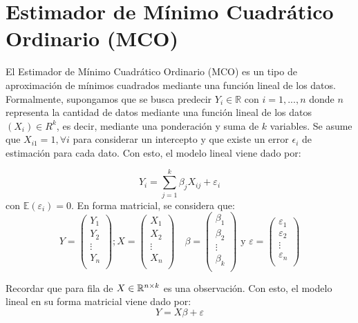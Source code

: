 \section{Estimador de Mínimo Cuadrático Ordinario (MCO)}

El Estimador de Mínimo Cuadrático Ordinario (MCO) es un tipo de aproximación de mínimos cuadrados mediante una función lineal de los datos. Formalmente, supongamos que se busca predecir $Y_i\in\mathbb{R}$ con $i=1,...,n$ donde $n$ representa la cantidad de datos mediante una función lineal de los datos $(X_i) \in R^{k}$, es decir, mediante una ponderación y suma de $k$ variables. Se asume que $X_{i1}=1,\forall i$ para considerar un intercepto y que existe un error $\epsilon_i$ de estimación para cada dato. Con esto, el modelo lineal viene dado por:

$$
Y_i= \sum_{j=1}^{k}\beta_j X_{ij} + \varepsilon_i
$$
con $\mathbb{E}(\varepsilon_i)=0$. En forma matricial, se considera que:
$$
Y=\begin{pmatrix}
Y_1 \\
Y_2\\
\vdots\\
Y_n\\
\end{pmatrix} ; 
X= \begin{pmatrix}
X_1 \\
X_2\\
\vdots\\
X_n\\
\end{pmatrix}
\quad
\beta= \begin{pmatrix}
\beta_1 \\
\beta_2\\
\vdots\\
\beta_k\\
\end{pmatrix} \text{ y }
\varepsilon= \begin{pmatrix}
\varepsilon_1 \\
\varepsilon_2\\
\vdots\\
\varepsilon_n\\
\end{pmatrix}
$$

Recordar que para fila de $X\in {\mathbb R}^{n \times k }$ es una observación. Con esto, el modelo lineal en su forma matricial viene dado por: 
$$
Y=X\beta + \varepsilon
$$

